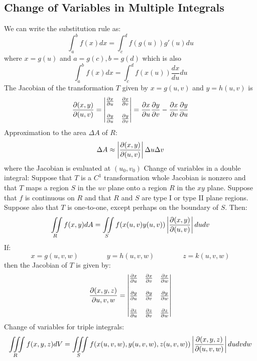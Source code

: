 \documentclass{article}
\begin{document}
    \subsection{Change of Variables in Multiple Integrals}
    \begin{outline}
        \1 We can write the substitution rule as: \[\int_a^bf(x)dx=\int_c^df(g(u))g'(u)du\] where \(x=g(u)\) and \(a=g(c),b=g(d)\) which is also \[\int_a^bf(x)dx=\int_c^df(x(u))\dfrac{dx}{du}du\]
        \1 The Jacobian of the transformation $T$ given by \(x=g(u,v)\) and \(y=h(u,v)\) is \[\pdv{(x,y)}{(u,v)}=\begin{vmatrix}
            \pdv{x}{u} & \pdv{x}{v} \\\\ \pdv{y}{u} & \pdv{y}{v}
        \end{vmatrix} = \pdv{x}{u}\pdv{y}{v}-\pdv{x}{v}\pdv{y}{u}\]
        \1 Approximation to the area \(\Delta A\) of $R$: \[\Delta A\approx\left|\pdv{(x,y)}{(u,v)}\right|\Delta u\Delta v\] where the Jacobian is evaluated at \((u_0,v_0)\)
        \1 Change of variables in a double integral: Suppose that $T$ is a \(C^1\) transformation whole Jacobian is nonzero and that $T$ maps a region $S$ in the \(uv\) plane onto a region $R$ in the \(xy\) plane. Suppose that $f$ is continuous on $R$ and that $R$ and $S$ are type I or type II plane regions. Suppose also that $T$ is one-to-one, except perhaps on the boundary of $S$. Then: \[\iint\limits_Rf(x,y)dA=\iint\limits_Sf(x(u,v)y(u,v))\left|\pdv{(x,y)}{(u,v)}\right|dudv\]
        \1 If: \[x=g(u,v,w)\qquad\qquad y=h(u,v,w)\qquad\qquad z=k(u,v,w)\] then the Jacobian of $T$ is given by: \[\pdv{(x,y,z)}{{u,v,w}}=\begin{vmatrix}
            \pdv{x}{u} & \pdv{x}{v} & \pdv{x}{w} \\\\ \pdv{y}{u} & \pdv{y}{v} & \pdv{y}{w} \\\\ \pdv{z}{u} & \pdv{z}{v} & \pdv{z}{w}
        \end{vmatrix}\]
        \1 Change of variables for triple integrals: \[\iiint\limits_Rf(x,y,z)dV=\iiint\limits_Sf(x(u,v,w),y(u,v,w),z(u,v,w))\left|\pdv{(x,y,z)}{(u,v,w)}\right| dudvdw\]
        
    \end{outline}
\end{document}

